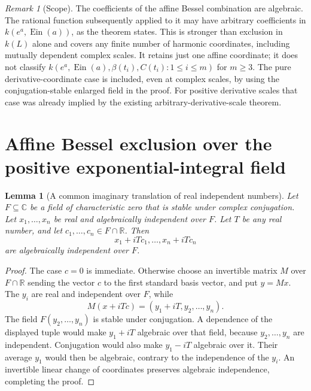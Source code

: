 \documentclass[11pt,a4paper]{article}
\newtheorem{lemma}[theorem]{Lemma}
\theoremstyle{definition}\newtheorem{definition}[theorem]{Definition}
\theoremstyle{remark}\newtheorem{remark}[theorem]{Remark}
\begin{document}
\begin{remark}[Scope]
The coefficients of the affine Bessel combination are algebraic.
The rational function subsequently applied to it may have arbitrary
coefficients in $k(e^a,\operatorname{Ein}(a))$, as the theorem states.
This is stronger than exclusion in $k(L)$ alone and covers any finite
number of harmonic coordinates, including mutually dependent complex
scales.  It retains just one affine coordinate; it does not classify
$k(e^a,\operatorname{Ein}(a),\beta(t_i),C(t_i):1\le i\le m)$ for
$m\ge3$.  The pure derivative-coordinate case is included, even at
complex scales, by using the conjugation-stable enlarged field in the
proof.  For positive derivative scales that case was already implied
by the existing arbitrary-derivative-scale theorem.
\end{remark}


\section{Affine Bessel exclusion over the positive exponential-integral field}
\label{ext:ape:section}

\begin{lemma}[A common imaginary translation of real independent numbers]
\label{ext:ape:imaginary-translation}
Let $F\subseteq\mathbb C$ be a field of characteristic zero that is stable
under complex conjugation.  Let $x_1,\ldots,x_n$ be real and algebraically
independent over $F$.  Let $T$ be any real number, and let
$c_1,\ldots,c_n\in F\cap\mathbb R$.  Then
\[
                     x_1+iTc_1,\ldots,x_n+iTc_n
\]
are algebraically independent over $F$.
\end{lemma}

\begin{proof}
The case $c=0$ is immediate.  Otherwise choose an invertible matrix
$M$ over $F\cap\mathbb R$ sending the vector $c$ to the first standard
basis vector, and put $y=Mx$.  The $y_i$ are real and independent over
$F$, while
\[
                    M(x+iTc)=(y_1+iT,y_2,\ldots,y_n).
\]
The field $F(y_2,\ldots,y_n)$ is stable under conjugation.  A dependence
of the displayed tuple would make $y_1+iT$ algebraic over that field,
because $y_2,\ldots,y_n$ are independent.  Conjugation would also make
$y_1-iT$ algebraic over it.  Their average $y_1$ would then be algebraic,
contrary to the independence of the $y_i$.  An invertible linear change
of coordinates preserves algebraic independence, completing the proof.
\end{proof}
\end{document}
